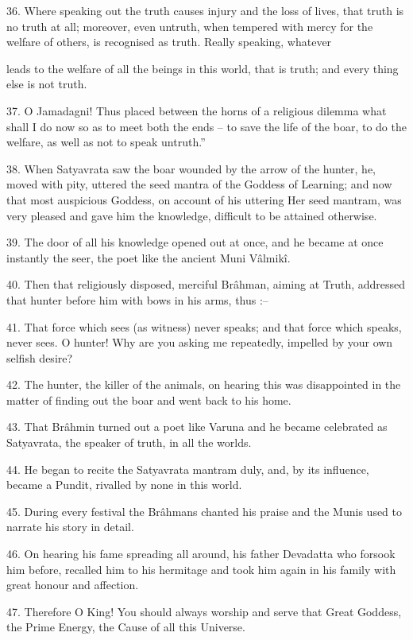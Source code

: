 36. Where speaking out the truth causes injury and the loss of lives, that truth is no truth at all; moreover, even untruth, when tempered with mercy for the welfare of others, is recognised as truth. Really speaking, whatever

leads to the welfare of all the beings in this world, that is truth; and every thing else is not truth.

37. O Jamadagni! Thus placed between the horns of a religious dilemma what shall I do now so as to meet both the ends -- to save the life of the boar, to do the welfare, as well as not to speak untruth.''

38. When Satyavrata saw the boar wounded by the arrow of the hunter, he, moved with pity, uttered the seed mantra of the Goddess of Learning; and now that most auspicious Goddess, on account of his uttering Her seed mantram, was very pleased and gave him the knowledge, difficult to be attained otherwise.

39. The door of all his knowledge opened out at once, and he became at once instantly the seer, the poet like the ancient Muni V\^almik\^i.

40. Then that religiously disposed, merciful Br\^ahman, aiming at Truth, addressed that hunter before him with bows in his arms, thus :--

41. That force which sees (as witness) never speaks; and that force which speaks, never sees. O hunter! Why are you asking me repeatedly, impelled by your own selfish desire?

42. The hunter, the killer of the animals, on hearing this was disappointed in the matter of finding out the boar and went back to his home.

43. That Br\^ahmin turned out a poet like Varuna and he became celebrated as Satyavrata, the speaker of truth, in all the worlds.

44. He began to recite the Satyavrata mantram duly, and, by its influence, became a Pundit, rivalled by none in this world.

45. During every festival the Br\^ahmans chanted his praise and the Munis used to narrate his story in detail.

46. On hearing his fame spreading all around, his father Devadatta who forsook him before, recalled him to his hermitage and took him again in his family with great honour and affection.

47. Therefore O King! You should always worship and serve that Great Goddess, the Prime Energy, the Cause of all this Universe.

